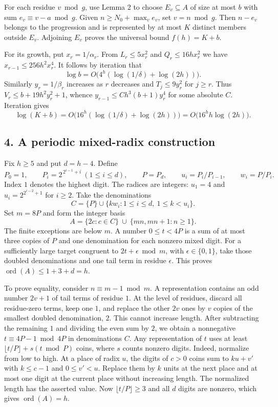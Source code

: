 \documentclass[
  11pt,
]{article}
\begin{document}
For each residue \(v\bmod g\), use Lemma 2 to choose \(E_v\subseteq A\)
of size at most \(b\) with sum \(e_v\equiv v-a\bmod g\). Given
\(n\ge N_0+\max_v e_v\), set \(v=n\bmod g\). Then \(n-e_v\) belongs to
the progression and is represented by at most \(K\) distinct members
outside \(E_v\). Adjoining \(E_v\) proves the universal bound
\(f(h)=K+b\).

For its growth, put \(x_r=1/\alpha_r\). From \(L_r\le5x_r^2\) and
\(Q_r\le16h x_r^2\) we have \(x_{r-1}\le256h^2x_r^4\). It follows by
iteration that \[
\log b=O\bigl(4^h(\log(1/\delta)+\log(2h))\bigr).
\] Similarly \(y_r=1/\beta_r\) increases as \(r\) decreases and
\(T_j\le9y_r^2\) for \(j\ge r\). Thus \(V_r\le b+19h^2y_r^2+1\), whence
\(y_{r-1}\le Ch^3(b+1)y_r^4\) for some absolute \(C\). Iteration gives
\[
\log(K+b)=O\bigl(16^h(\log(1/\delta)+\log(2h))\bigr)
=O\bigl(16^h h\log(2h)\bigr).
\]

\subsection{4. A periodic mixed-radix
construction}\label{a-periodic-mixed-radix-construction}

Fix \(h\ge5\) and put \(d=h-4\). Define \[
P_0=1,\qquad P_i=2^{\,2^{i-1}+i}\ (1\le i\le d),\qquad
P=P_d,\qquad u_i=P_i/P_{i-1},\qquad w_i=P/P_i.
\] Index \(1\) denotes the highest digit. The radices are integers:
\(u_1=4\) and \(u_i=2^{2^{i-2}+1}\) for \(i\ge2\). Take the
denominations \[
C=\{P\}\cup\{kw_i:1\le i\le d,\ 1\le k<u_i\}.
\] Set \(m=8P\) and form the integer basis \[
A=\{2c:c\in C\}\ \cup\ \{mn,mn+1:n\ge1\}.
\] The finite exceptions are below \(m\). A number \(0\le t<4P\) is a
sum of at most three copies of \(P\) and one denomination for each
nonzero mixed digit. For a sufficiently large target congruent to
\(2t+\epsilon\bmod m\), with \(\epsilon\in\{0,1\}\), take those doubled
denominations and one tail term in residue \(\epsilon\). This proves
\(\operatorname{ord}(A)\le 1+3+d=h\).

To prove equality, consider \(n\equiv m-1\bmod m\). A representation
contains an odd number \(2v+1\) of tail terms of residue \(1\). At the
level of residues, discard all residue-zero terms, keep one \(1\), and
replace the other \(2v\) ones by \(v\) copies of the smallest doubled
denomination, \(2\). This cannot increase length. After subtracting the
remaining \(1\) and dividing the even sum by \(2\), we obtain a
nonnegative \(t\equiv4P-1\bmod 4P\) in denominations \(C\). Any
representation of \(t\) uses at least \(\lfloor t/P\rfloor+s(t\bmod P)\)
coins, where \(s\) counts nonzero digits. Indeed, normalize from low to
high. At a place of radix \(u\), the digits of \(c>0\) coins sum to
\(ku+v'\) with \(k\le c-1\) and \(0\le v'<u\). Replace them by \(k\)
units at the next place and at most one digit at the current place
without increasing length. The normalized length has the asserted value.
Now \(\lfloor t/P\rfloor\ge3\) and all \(d\) digits are nonzero, which
gives \(\operatorname{ord}(A)=h\).
\end{document}
